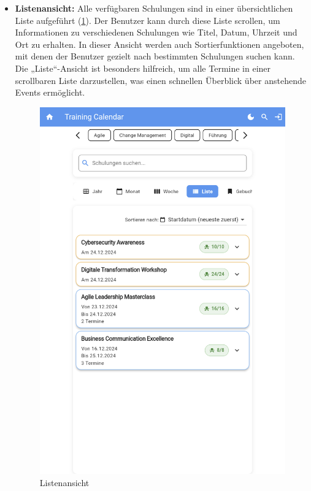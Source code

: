 \begin{itemize}
    \item \textbf{Listenansicht:} Alle verfügbaren Schulungen sind in einer übersichtlichen Liste aufgeführt (\ref{List}). Der Benutzer kann durch diese Liste scrollen, um Informationen zu verschiedenen Schulungen wie Titel, Datum, Uhrzeit und Ort zu erhalten. In dieser Ansicht werden auch Sortierfunktionen angeboten, mit denen der Benutzer gezielt nach bestimmten Schulungen suchen kann. Die „Liste“-Ansicht ist besonders hilfreich, um alle Termine in einer scrollbaren Liste darzustellen, was einen schnellen Überblick über anstehende Events ermöglicht.
    \begin{figure}[htbp!]
        \centering
        \includegraphics[scale=0.2]{img/flutter_09.png}
        \caption{ Listenansicht }
        \label{List}
    \end{figure}


\end{itemize}
